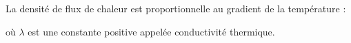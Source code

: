 ﻿\documentclass[a4paper]{article}
\begin{document}
\pagestyle{fancy}
\fancyhf{}
\setlength{\headheight}{15pt}

\begin{center}
	\large{}
\end{center}


La densité de flux de chaleur est proportionnelle au gradient de la température :
\begin{center}
\end{center}
où \(\lambda\) est une constante positive appelée conductivité thermique.
\end{document}
